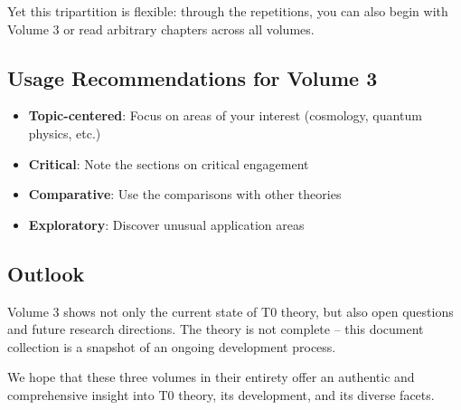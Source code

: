 Yet this tripartition is flexible: through the repetitions, you can also begin with Volume 3 or read arbitrary chapters across all volumes.

\subsection*{Usage Recommendations for Volume 3}

\begin{itemize}
\item \textbf{Topic-centered}: Focus on areas of your interest (cosmology, quantum physics, etc.)
\item \textbf{Critical}: Note the sections on critical engagement
\item \textbf{Comparative}: Use the comparisons with other theories
\item \textbf{Exploratory}: Discover unusual application areas
\end{itemize}

\subsection*{Outlook}

Volume 3 shows not only the current state of T0 theory, but also open questions and future research directions. The theory is not complete -- this document collection is a snapshot of an ongoing development process.

\vspace{1em}
\noindent
We hope that these three volumes in their entirety offer an authentic and comprehensive insight into T0 theory, its development, and its diverse facets.


